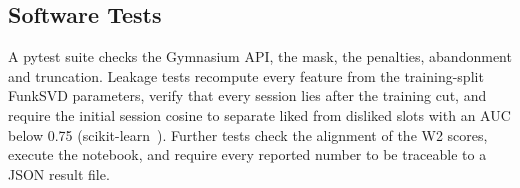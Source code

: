 \subsection{Software Tests}
\label{sec:tests}

A pytest suite checks the Gymnasium API, the mask, the penalties, abandonment and truncation. Leakage tests recompute every feature from the training-split FunkSVD parameters, verify that every session lies after the training cut, and require the initial session cosine to separate liked from disliked slots with an AUC below 0.75 (scikit-learn~\cite{pedregosa2011scikit}). Further tests check the alignment of the W2 scores, execute the notebook, and require every reported number to be traceable to a JSON result file.
